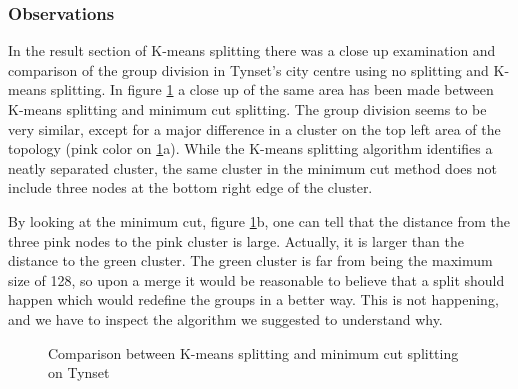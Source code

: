 \subsubsection{Observations}
In the result section of K-means splitting there was a close up examination and comparison of the group division in Tynset's city centre using no splitting and K-means splitting.
In figure \ref{fig:mincutcomparison} a close up of the same area has been made between K-means splitting and minimum cut splitting. The group division seems to 
be very similar, except for a major difference in a cluster on the top left area of the topology (pink color on \ref{fig:mincutcomparison}a).
While the K-means splitting algorithm identifies a neatly separated cluster, the same cluster in the minimum cut method does not include three nodes at the bottom right edge of the cluster.

By looking at the minimum cut, figure \ref{fig:mincutcomparison}b, one can tell that the distance from the three pink nodes to the pink cluster is large.
Actually, it is larger than the distance to the green cluster. The green cluster is far from being the maximum size of 128, so upon a merge it would be reasonable to believe
that a split should happen which would redefine the groups in a better way. This is not happening, and we have to inspect the algorithm we suggested to understand why. 
\begin{figure}
	\centering
		\qquad
		\caption{Comparison between K-means splitting and minimum cut splitting on Tynset}%
		\label{fig:mincutcomparison}%
\end{figure}


